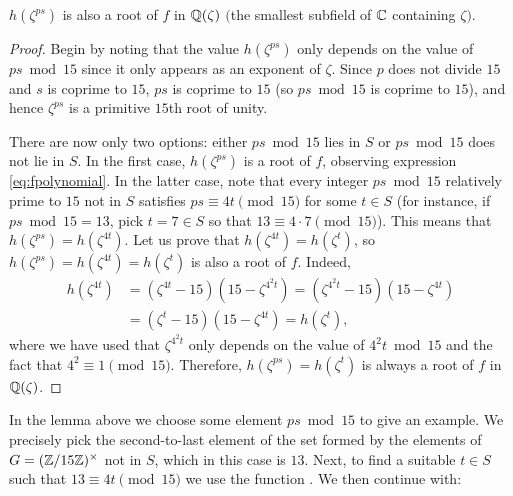 \documentclass[../main.tex]{subfiles}
\begin{document}
\begin{mdframed}
 	\begin{lemmanonumber}
 		$h(\zeta^{ps})$ is also a root of $f$ in $\mathbb{Q}(\zeta)$ $($the smallest subfield of $\mathbb{C}$ containing $\zeta)$.
 	\end{lemmanonumber}
 	\begin{proof}
 		Begin by noting that the value $h(\zeta^{ps})$ only depends on the value of $ps \bmod{15}$ since it only appears as an exponent of $\zeta$. Since $p$ does not divide $15$ and $s$ is coprime to $15$, $ps$ is coprime to $15$ (so $ps \bmod{15}$ is coprime to $15$), and hence $\zeta^{ps}$ is a primitive $15$th root of unity.
 		
 		There are now only two options: either $ps \bmod{15}$ lies in $S$ or $ps \bmod{15}$ does not lie in $S$. In the first case, $h(\zeta^{ps})$ is a root of $f$, observing expression \cref{eq:fpolynomial}. In the latter case, note that every integer $ps \bmod{15}$ relatively prime to $15$ not in $S$ satisfies $ps\equiv 4t\pmod{15}$ for some $t\in S$ (for instance, if $ps \bmod{15}=13$, pick $t=7\in S$ so that $13\equiv 4\cdot7 \pmod{15}$). This means that $h(\zeta^{ps})=h(\zeta^{4t})$. Let us prove that $h(\zeta^{4t})=h(\zeta^{t})$, so $h(\zeta^{ps})=h(\zeta^{4t})=h(\zeta^{t})$ is also a root of $f$. Indeed,
 		\begin{align*}
 			h(\zeta^{4t})&=(\zeta^{4t}-15)(15-\zeta^{4^2t})=(\zeta^{4^2t}-15)(15-\zeta^{4t})\\
 			&=(\zeta^{t}-15)(15-\zeta^{4t})=h(\zeta^{t}),
 		\end{align*}
 		where we have used that $\zeta^{4^2t}$ only depends on the value of $4^2t \bmod{15}$ and the fact that $4^2\equiv 1\pmod{15}$. Therefore, $h(\zeta^{ps})=h(\zeta^{t})$ is always a root of $f$ in $\mathbb{Q}(\zeta)$.
 	\end{proof}
 	\end{mdframed}
 	
 	In the lemma above we choose some element $ps \bmod{15}$ to give an example. We precisely pick the second-to-last element of the set formed by the elements of $G=(\mathbb{Z}/15\mathbb{Z})^\times$ not in $S$, which in this case is $13$. Next, to find a suitable $t\in S$ such that $13\equiv4t \pmod{15}$ we use the function \textcolor{blue}{}. We then continue with:\\
 	
\end{document}
